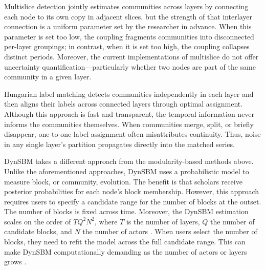 \documentclass[11pt, letterpaper]{article}
\begin{document}
Multislice detection jointly estimates communities across layers by connecting each node to its own copy in adjacent slices, but the strength of that interlayer connection is a uniform parameter set by the researcher in advance. When this parameter is set too low, the coupling fragments communities into disconnected per-layer groupings; in contrast, when it is set too high, the coupling collapses distinct periods. Moreover, the current implementations of multislice do not offer uncertainty quantification---particularly whether two nodes are part of the same community in a given layer.

Hungarian label matching detects communities independently in each layer and then aligns their labels across connected layers through optimal assignment. Although this approach is fast and transparent, the temporal information never informs the communities themselves. When communities merge, split, or briefly disappear, one-to-one label assignment often misattributes continuity. Thus, noise in any single layer's partition propagates directly into the matched series.

DynSBM takes a different approach from the modularity-based methods above. Unlike the aforementioned approaches, DynSBM uses a probabilistic model to measure block, or community, evolution. The benefit is that scholars receive posterior probabilities for each node's block membership. %
However, this approach requires users to specify a candidate range for the number of blocks at the outset. The number of blocks is fixed across time. Moreover, the DynSBM estimation scales on the order of $TQ^2N^2$, where $T$ is the number of layers, $Q$ the number of candidate blocks, and $N$ the number of actors \citep{matias2017statistical}.  When users select the number of blocks, they need to refit the model across the full candidate range. This can make DynSBM computationally demanding as the number of actors or layers grows \citep{matias2017statistical, ludkin2018dynamic}.
\end{document}
